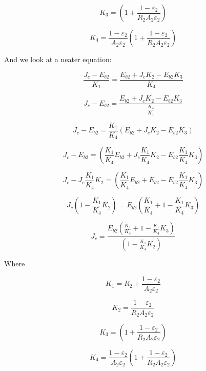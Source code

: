 \documentclass[12pt]{article}
\renewcommand{\_}{\kern-1.5pt\textunderscore\kern-1.5pt}
\begin{document}
 \[ K_{3}= \left( 1+\frac{1- \varepsilon _{2}}{R_{2}A_{2} \varepsilon _{2}} \right)  \] \par

 \[ K_{4}=\frac{1- \varepsilon _{2}}{A_{2} \varepsilon _{2}} \left( 1+\frac{1- \varepsilon _{2}}{R_{2}A_{2} \varepsilon _{2}} \right)  \] \par

And we look at a neater equation:\par

 \[ \frac{J_{c}-E_{b2}}{K_{1}}=\frac{E_{b2}+J_{c}K_{2}-E_{b2}K_{3}}{K_{4}} \] \par

 \[ J_{c}-E_{b2}=\frac{E_{b2}+J_{c}K_{2}-E_{b2}K_{3}}{\frac{K_{4}}{K_{1}}} \] \par

 \[ J_{c}-E_{b2}=\frac{K_{1}}{K_{4}} \left( E_{b2}+J_{c}K_{2}-E_{b2}K_{3} \right)  \] \par

 \[ J_{c}-E_{b2}= \left( \frac{K_{1}}{K_{4}}E_{b2}+J_{c}\frac{K_{1}}{K_{4}}K_{2}-E_{b2}\frac{K_{1}}{K_{4}}K_{3} \right)  \] \par

 \[ J_{c}-J_{c}\frac{K_{1}}{K_{4}}K_{2}= \left( \frac{K_{1}}{K_{4}}E_{b2}+E_{b2}-E_{b2}\frac{K_{1}}{K_{4}}K_{3} \right)  \] \par

 \[ J_{c} \left( 1-\frac{K_{1}}{K_{4}}K_{2} \right) =E_{b2} \left( \frac{K_{1}}{K_{4}}+1-\frac{K_{1}}{K_{4}}K_{3} \right)  \] \par

 \[ J_{c}=\frac{E_{b2} \left( \frac{K_{1}}{K_{4}}+1-\frac{K_{1}}{K_{4}}K_{3} \right) }{ \left( 1-\frac{K_{1}}{K_{4}}K_{2} \right) } \] \par

Where \par

 \[ K_{1}=R_{2}+\frac{1- \varepsilon _{2}}{A_{2} \varepsilon _{2}} \] \par

 \[ K_{2}=\frac{1- \varepsilon _{2}}{R_{2}A_{2} \varepsilon _{2}} \] \par

 \[ K_{3}= \left( 1+\frac{1- \varepsilon _{2}}{R_{2}A_{2} \varepsilon _{2}} \right)  \] \par

 \[ K_{4}=\frac{1- \varepsilon _{2}}{A_{2} \varepsilon _{2}} \left( 1+\frac{1- \varepsilon _{2}}{R_{2}A_{2} \varepsilon _{2}} \right)  \] \par
\end{document}
